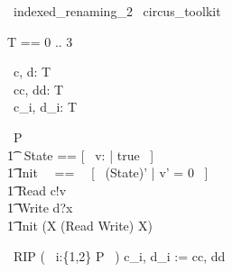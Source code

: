 \begin{zsection}
  \SECTION\ indexed\_renaming\_2 \parents\ circus\_toolkit
\end{zsection}

\begin{zed}
	T == 0 .. 3 
\end{zed}

\begin{circus}
	\circchannel\ c, d: T \\
	\circchannel\ cc, dd: T \cross \nat \\
	\circchannel\ c\_i, d\_i: T \cross \nat \\
\end{circus}

\begin{circus}
    \circprocess\ P \circdef \circbegin \\
        \t1 \circstate\ State == [~ v: \nat | true ~] \\
        \t1 Init ~~==~~ [~ (State)' | v' = 0 ~] \\
        \t1 Read \circdef c!v \then \Skip \\
        \t1 Write \circdef d?x \then \Skip \\
        \t1 \circspot \lschexpract Init \rschexpract \circseq (\circmu X \circspot (Read \extchoice Write) \circseq X) \\ 
	\circend
\end{circus}

\begin{circus}
    \circprocess\ RIP \circdef (~ i:\{1,2\} \circindex P ~) \lcircrename c\_i, d\_i := cc, dd \rcircrename \\
\end{circus}
